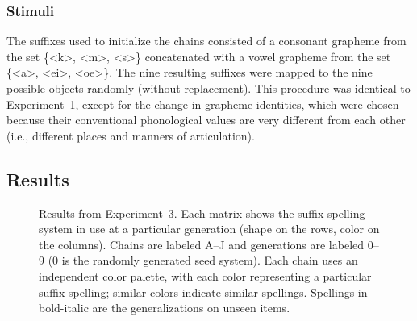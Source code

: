 \documentclass[doc,biblatex]{apa7}
\begin{document}
\subsubsection{Stimuli}

The suffixes used to initialize the chains consisted of a consonant grapheme from the set \{<k>, <m>, <s>\} concatenated with a vowel grapheme from the set \{<a>, <ei>, <oe>\}. The nine resulting suffixes were mapped to the nine possible objects randomly (without replacement). This procedure was identical to Experiment~1, except for the change in grapheme identities, which were chosen because their conventional phonological values are very different from each other (i.e., different places and manners of articulation).

\subsection{Results}

	\begin{figure}
	\vspace*{2pt}
	\caption{Results from Experiment~3. Each matrix shows the suffix spelling system in use at a particular generation (shape on the rows, color on the columns). Chains are labeled A--J and generations are labeled 0--9 (0 is the randomly generated seed system). Each chain uses an independent color palette, with each color representing a particular suffix spelling; similar colors indicate similar spellings. Spellings in bold-italic are the generalizations on unseen items.}
	\label{supp2}
	\end{figure}
\end{document}
